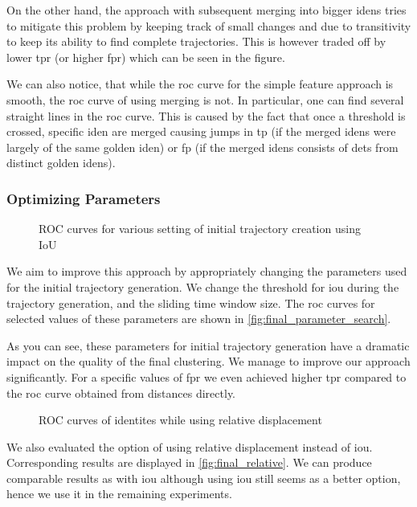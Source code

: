 On the other hand, the approach with subsequent merging into bigger \glspl{iden} tries to mitigate this problem by keeping track of small changes and due to transitivity to keep its ability to find complete trajectories. This is however traded off by lower \gls{tpr} (or higher \gls{fpr}) which can be seen in the figure.

We can also notice, that while the \gls{roc} curve for the simple feature approach is smooth, the \gls{roc} curve of using merging is not. In particular, one can find several straight lines in the \gls{roc} curve. This is caused by the fact that once a threshold is crossed, specific \gls{iden} are merged causing jumps in \gls{tp} (if the merged \glspl{iden} were largely of the same golden \gls{iden}) or \gls{fp} (if the merged \glspl{iden} consists of \glspl{det} from distinct golden \glspl{iden}).

\subsubsection{Optimizing Parameters}

\begin{figure}
    \centering
    \def\svgwidth{\columnwidth}
    {}
    \caption{ROC curves for various setting of initial trajectory creation using IoU}
    \label{fig:final_parameter_search}
\end{figure}

We aim to improve this approach by appropriately changing the parameters used for the initial trajectory generation. We change the threshold for \gls{iou} during the trajectory generation, and the sliding time window size. The \gls{roc} curves for selected values of these parameters are shown in \autoref{fig:final_parameter_search}.

As you can see, these parameters for initial trajectory generation have a dramatic impact on the quality of the final clustering. We manage to improve our approach significantly. For a specific values of \gls{fpr} we even achieved higher \gls{tpr} compared to the \gls{roc} curve obtained from distances directly.

\begin{figure}
    \centering
    \def\svgwidth{\columnwidth}
    {}
    \caption{ROC curves of identites while using relative displacement}
    \label{fig:final_relative}
\end{figure}

We also evaluated the option of using relative displacement instead of \gls{iou}. Corresponding results are displayed in \autoref{fig:final_relative}. We can produce comparable results as with \gls{iou} although using \gls{iou} still seems as a better option, hence we use it in the remaining experiments.

